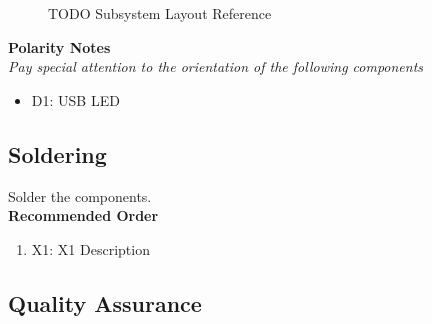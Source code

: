 \documentclass{article}
\begin{document}
\begin{figure}[H]
    \centering
        \qquad
        \caption{TODO Subsystem Layout Reference}%
    \label{fig:TODO-layout}%
\end{figure}

\noindent \textbf{Polarity Notes}\\
\noindent \textit{Pay special attention to the orientation of the following components}
\begin{itemize}
  \item D1: USB LED
\end{itemize}

\subsection{Soldering}

Solder the components. \\

\noindent \textbf{Recommended Order}

\begin{enumerate}
  \item X1: X1 Description
\end{enumerate}
\subsection{Quality Assurance}
\end{document}
